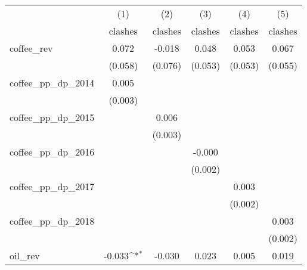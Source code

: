 {
\def\sym#1{\ifmmode^{#1}\else\(^{#1}\)\fi}
\begin{tabular}{l*{5}{c}}
\hline\hline
            &\multicolumn{1}{c}{(1)}&\multicolumn{1}{c}{(2)}&\multicolumn{1}{c}{(3)}&\multicolumn{1}{c}{(4)}&\multicolumn{1}{c}{(5)}\\
            &\multicolumn{1}{c}{clashes}&\multicolumn{1}{c}{clashes}&\multicolumn{1}{c}{clashes}&\multicolumn{1}{c}{clashes}&\multicolumn{1}{c}{clashes}\\
\hline
coffee\_rev  &       0.072         &      -0.018         &       0.048         &       0.053         &       0.067         \\
            &     (0.058)         &     (0.076)         &     (0.053)         &     (0.053)         &     (0.055)         \\
[1em]
coffee\_pp\_dp\_2014&       0.005         &                     &                     &                     &                     \\
            &     (0.003)         &                     &                     &                     &                     \\
[1em]
coffee\_pp\_dp\_2015&                     &       0.006         &                     &                     &                     \\
            &                     &     (0.003)         &                     &                     &                     \\
[1em]
coffee\_pp\_dp\_2016&                     &                     &      -0.000         &                     &                     \\
            &                     &                     &     (0.002)         &                     &                     \\
[1em]
coffee\_pp\_dp\_2017&                     &                     &                     &       0.003         &                     \\
            &                     &                     &                     &     (0.002)         &                     \\
[1em]
coffee\_pp\_dp\_2018&                     &                     &                     &                     &       0.003         \\
            &                     &                     &                     &                     &     (0.002)         \\
[1em]
oil\_rev     &      -0.033\sym{*}  &      -0.030         &       0.023         &       0.005         &       0.019         \\

\end{tabular}}
